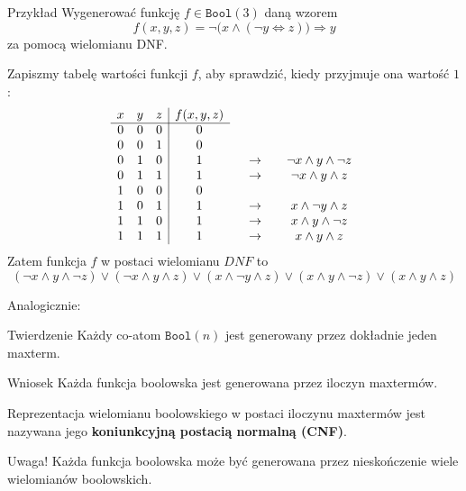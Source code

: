 \documentclass[a4paper,10pt]{beamer}
\begin{document}
		
		
\begin{frame}
			
	\begin{exampleblock}{Przykład}
		Wygenerować funkcję $f\in\mathtt{Bool}(3) $ daną wzorem $$f(x,y,z)=\neg\big(x\wedge(\neg y\Leftrightarrow z)\big)\Rightarrow y$$ za pomocą wielomianu DNF.
		
		Zapiszmy tabelę wartości funkcji $f$, aby sprawdzić, kiedy przyjmuje ona wartość $1$:
		$$\begin{array}{ccc|ccccc}
			x&y&z&f(x,y,z)\\\cline{1-4}
			0&0&0&0\\
			0&0&1&0\\
			0&1&0&1&&\to&&\neg x\wedge y\wedge \neg z\\
			0&1&1&1&&\to&&\neg x\wedge y\wedge z\\
			1&0&0&0\\
			1&0&1&1&&\to&&x\wedge\neg y\wedge z\\
			1&1&0&1&&\to&&x\wedge y\wedge \neg z\\
			1&1&1&1&&\to&&x\wedge y\wedge z
		\end{array}$$
	Zatem funkcja $f$ w postaci wielomianu $DNF$ to
	$$(\neg x\wedge y\wedge \neg z)\vee(\neg x\wedge y\wedge z)\vee(x\wedge\neg y\wedge z)\vee(x\wedge y\wedge \neg z)\vee(x\wedge y\wedge z)$$
	\end{exampleblock}
	
\end{frame}


\begin{frame}
	
	Analogicznie:
	
	\begin{block}{Twierdzenie}
		Każdy co-atom $\mathtt{Bool}(n)$ jest generowany przez dokładnie jeden maxterm.
	\end{block}
	
	\begin{block}{Wniosek}
		Każda funkcja boolowska jest generowana przez iloczyn maxtermów.
	\end{block}
	
	Reprezentacja wielomianu boolowskiego w postaci iloczynu maxtermów jest nazywana jego {\bf koniunkcyjną postacią normalną (CNF)}.
	
	\begin{alertblock}{Uwaga!}
		Każda funkcja boolowska może być generowana przez nieskończenie wiele wielomianów boolowskich.
	\end{alertblock}

	
\end{frame}
\end{document}
